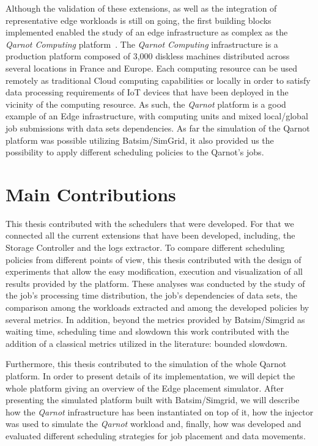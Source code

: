Although the validation of these extensions, as well as the integration of representative edge workloads is still on going, the first building blocks implemented enabled the study of an edge infrastructure as complex as the \emph{Qarnot Computing} platform~\cite{qarnot_web}. The \emph{Qarnot Computing} infrastructure is a production platform composed of 3,000 diskless machines distributed across several locations in France and Europe. Each computing resource can be used remotely as traditional Cloud computing capabilities or locally in order to satisfy data processing requirements of IoT devices that have been deployed in the vicinity of the computing resource. As such, the \emph{Qarnot} platform is a good example of an Edge infrastructure, with computing units and mixed local/global job submissions with data sets dependencies. As far the simulation of the Qarnot platform was possible utilizing Batsim/SimGrid, it also provided us the possibility to apply different scheduling policies to the Qarnot's jobs.

\section{Main Contributions}

This thesis contributed with the schedulers that were developed. For that we connected all the current extensions that have been developed, including, the Storage Controller and the logs extractor.
To compare different scheduling policies from different points of view, this thesis contributed with the design of experiments that allow the easy modification, execution and visualization of all results provided by the platform.
These analyses was conducted by the study of the job's processing time distribution, the job's dependencies of data sets, the comparison among the workloads extracted and among the developed policies by several metrics. In addition, beyond the metrics provided by Batsim/Simgrid as waiting time, scheduling time and slowdown this work contributed with the addition of a classical metrics utilized in the literature: bounded slowdown. 

Furthermore, this thesis contributed to the simulation of the whole Qarnot platform. In order to present details of its implementation, we will depict the whole platform giving an overview of the Edge placement simulator. After presenting the simulated platform built with Batsim/Simgrid, we will describe how the \emph{Qarnot} infrastructure has been instantiated on top of it, how the injector was used to simulate the \emph{Qarnot} workload and, finally, how was developed and evaluated different scheduling strategies for job placement and data movements.

